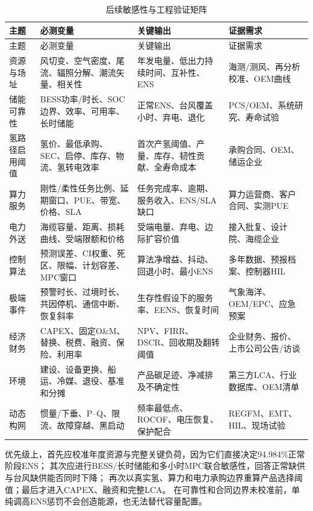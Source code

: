 \begin{longtable}{p{2.0cm}p{3.6cm}p{4.1cm}p{3.1cm}}
\caption{后续敏感性与工程验证矩阵}\label{tab:c5-next-tests}\\
\toprule
主题 & 必测变量 & 关键输出 & 证据需求\\
\midrule
\endfirsthead
\toprule
主题 & 必测变量 & 关键输出 & 证据需求\\
\midrule
\endhead
资源与场址 & 风切变、空气密度、尾流、辐照分解、潮流矢量、相关性 & 年发电量、低出力持续时间、互补性、ENS & 海测/测风、再分析校准、OEM曲线\\
储能可靠性 & BESS功率/时长、SOC边界、效率、可用率、长时储能 & 正常ENS、台风覆盖小时、弃电、退化 & PCS/\allowbreak OEM、系统研究、寿命试验\\
氢路径启用阈值 & 氢价、最低承购、SEC、启停、库存、物流、氢转电效率 & 首次产氢阈值、产量、库存、韧性贡献、全寿命成本 & 承购合同、OEM、储运企业\\
算力服务 & 刚性/柔性任务比例、延期窗口、PUE、带宽、价格、SLA & 任务完成率、逾期、服务收入、ENS/SLA缺口 & 算力运营商、客户合同、实测PUE\\
电力外送 & 海缆容量、距离、损耗曲线、受端限额和价格 & 受端电量、弃电、边际扩容价值 & 接入批复、设计院、海缆企业\\
控制算法 & 预测误差、CI权重、死区、限幅、计划容差、MPC窗口 & 算法净增益、抖动、回退小时、最小ENS & 多年数据、预报档案、控制器HIL\\
极端事件 & 预警时长、过境时长、共因停机、通信中断、恢复斜率 & 生存性假设下的服务率、EENS、恢复时间 & 气象海洋、OEM/\allowbreak EPC、应急预案\\
经济财务 & CAPEX、固定O\&M、替换、税费、融资、保险、利用率 & NPV、FIRR、DSCR、回收期及翻转阈值 & 企业财务、报价、上市公司公告/访谈\\
环境 & 建设、设备更换、船运、冷媒、退役、基准和分摊 & 产品碳足迹、净减排及不确定性 & 第三方LCA、行业数据库、OEM清单\\
动态构网 & 惯量/下垂、P--Q、限流、故障穿越、黑启动 & 频率最低点、ROCOF、电压恢复、保护配合 & REGFM、EMT、HIL、现场试验\\
\bottomrule
\end{longtable}

优先级上，首先应校准年度资源与完整关键负荷，因为它们直接决定94.984\%正常阶段ENS；
其次应进行BESS/长时储能和多小时MPC联合敏感性，回答正常缺供与台风缺供能否同时下降；
再次以真实氢、算力和电力承购边界重算产品选择阈值；最后才进入CAPEX、融资和完整LCA。
在可靠性和合同边界未校准前，单纯调高ENS惩罚不会创造能源，也无法替代容量配置。

